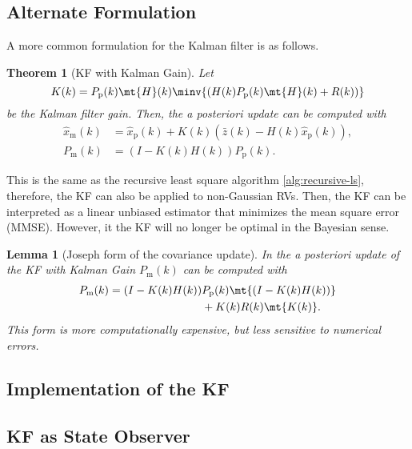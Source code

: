\documentclass[margin=small]{hsrzf}
\theoremstyle{plain}
\newtheorem{thm}{Theorem}[section]
\newtheorem{lemma}{Lemma}[section]
\theoremstyle{definition}
\theoremstyle{remark}
\begin{document}
\subsection{Alternate Formulation}

A more common formulation for the Kalman filter is as follows.

\begin{thm}[KF with Kalman Gain]
  Let
  \[
    K(k) = P_\mathrm{p}(k) \mt{H}(k) \minv{(
      H(k) P_\mathrm{p}(k) \mt{H}(k) + R(k)
    )}
  \]
  be the Kalman filter gain. Then, the a posteriori update can be computed
  with
  \begin{align*}
    \hat{x}_\mathrm{m}(k) &= \hat{x}_\mathrm{p}(k) + K(k)(
      \bar{z}(k) - H(k) \hat{x}_\mathrm{p}(k)
    ), \\
    P_\mathrm{m}(k) &= (I - K(k) H(k)) P_\mathrm{p}(k).
  \end{align*}
\end{thm}

This is the same as the recursive least square algorithm
\ref{alg:recursive-ls}, therefore, the KF can also be applied to non-Gaussian
RVs. Then, the KF can be interpreted as a linear unbiased estimator that
minimizes the mean square error (MMSE). However, it the KF will no longer be
optimal in the Bayesian sense.

\begin{lemma}[Joseph form of the covariance update]
  In the a posteriori update of the KF with Kalman Gain $P_\mathrm{m}(k)$ can
  be computed with
  \begin{align*}
    P_\mathrm{m}(k) = (I - K(k) H(k)) 
      &P_\mathrm{p}(k) \mt{(I - K(k) H(k))} \\
      &+ K(k) R(k) \mt{K(k)}.
  \end{align*}
  This form is more computationally expensive, but less sensitive to numerical
  errors.
\end{lemma}

\subsection{Implementation of the KF}

\subsection{KF as State Observer}
\end{document}
